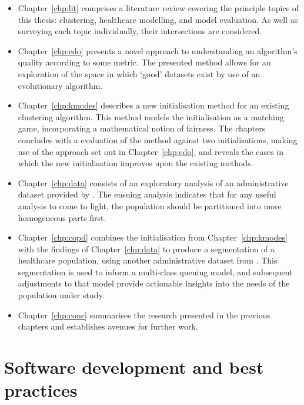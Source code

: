 \begin{itemize}
    \item Chapter~\ref{chp:lit} comprises a literature review covering the
        principle topics of this thesis: clustering, healthcare modelling, and
        model evaluation. As well as surveying each topic individually, their
        intersections are considered.
    \item Chapter~\ref{chp:edo} presents a novel approach to understanding an
        algorithm's quality according to some metric. The presented method
        allows for an exploration of the space in which `good' datasets exist
        by use of an evolutionary algorithm.
    \item Chapter~\ref{chp:kmodes} describes a new initialisation method for an
        existing clustering algorithm. This method models the initialisation as
        a matching game, incorporating a mathematical notion of fairness. The
        chapters concludes with a evaluation of the method against two
        initialisations, making use of the approach set out in
        Chapter~\ref{chp:edo}, and reveals the cases in which the new
        initialisation improves upon the existing methods.
    \item Chapter~\ref{chp:data} consists of an exploratory analysis of an
        administrative dataset provided by \ctmuhb. The ensuing analysis
        indicates that for any useful analysis to come to light, the population
        should be partitioned into more homogeneous parts first.
    \item Chapter~\ref{chp:copd} combines the initialisation from
        Chapter~\ref{chp:kmodes} with the findings of Chapter~\ref{chp:data} to
        produce a segmentation of a healthcare population, using another
        administrative dataset from \ctmuhb. This segmentation is used to inform
        a multi-class queuing model, and subsequent adjustments to that model
        provide actionable insights into the needs of the population under
        study.
    \item Chapter~\ref{chp:conc} summarises the research presented in the
        previous chapters and establishes avenues for further work.
\end{itemize}

\section{Software development and best practices}\label{sec:dev}

